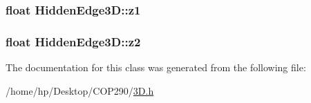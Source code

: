 \subsubsection[{\texorpdfstring{z1}{z1}}]{\setlength{\rightskip}{0pt plus 5cm}float Hidden\+Edge3\+D\+::z1}\hypertarget{class_hidden_edge3_d_ae69d570fdf699cb4ea7cd042610bdf44}{}\label{class_hidden_edge3_d_ae69d570fdf699cb4ea7cd042610bdf44}
\subsubsection[{\texorpdfstring{z2}{z2}}]{\setlength{\rightskip}{0pt plus 5cm}float Hidden\+Edge3\+D\+::z2}\hypertarget{class_hidden_edge3_d_a0434915b2dd8ae71eccf8ecdba418da5}{}\label{class_hidden_edge3_d_a0434915b2dd8ae71eccf8ecdba418da5}


The documentation for this class was generated from the following file\+:\begin{DoxyCompactItemize}
\item 
/home/hp/\+Desktop/\+C\+O\+P290/\hyperlink{3_d_8h}{3\+D.\+h}\end{DoxyCompactItemize}
